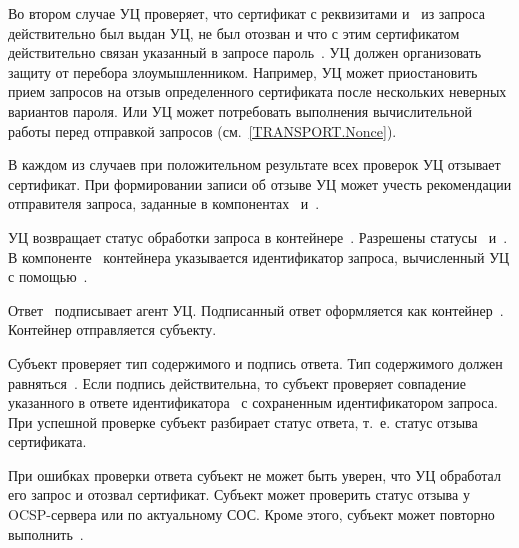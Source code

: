Во втором случае УЦ проверяет, что сертификат с реквизитами 
и~ из запроса действительно был выдан УЦ, не был отозван и
что с этим сертификатом действительно связан указанный в запросе
пароль~.
%
УЦ должен организовать защиту от перебора  злоумышленником.
Например, УЦ может приостановить прием запросов на отзыв определенного
сертификата после нескольких неверных вариантов пароля. Или УЦ может потребовать
выполнения вычислительной работы перед отправкой запросов
(см.~\ref{TRANSPORT.Nonce}).

В каждом из случаев при положительном результате всех проверок УЦ отзывает
сертификат. При формировании записи об отзыве УЦ может учесть рекомендации
отправителя запроса, заданные в компонентах~
и~.

УЦ возвращает статус обработки запроса в контейнере~. Разрешены
статусы~ и~. В компоненте~
контейнера указывается идентификатор запроса, вычисленный УЦ с
помощью~.

Ответ~ подписывает агент УЦ. Подписанный ответ оформляется как
контейнер~. Контейнер отправляется субъекту.

Субъект проверяет тип содержимого и подпись ответа. Тип содержимого должен
равняться~. Если подпись действительна, то субъект проверяет
совпадение указанного в ответе идентификатора~ с сохраненным
идентификатором запроса. При успешной проверке субъект разбирает статус ответа,
т.~е. статус отзыва сертификата.

При ошибках проверки ответа субъект не может быть уверен, что УЦ обработал его
запрос и отозвал сертификат. Субъект может проверить статус отзыва у
OCSP-сервера или по актуальному СОС. Кроме этого, субъект может повторно
выполнить~.

